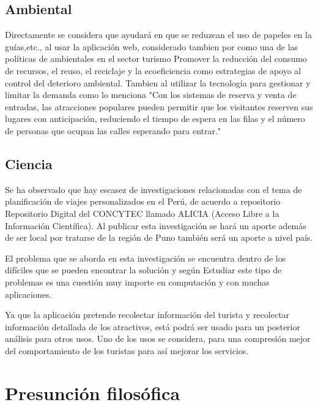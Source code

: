 \subsection{Ambiental}
Directamente se considera que ayudará en que se reduzcan el uso de papeles en la guías,etc., al usar la aplicación web, considerado tambien por  como una de las políticas de ambientales en el sector turismo Promover la reducción del consumo de recursos, el reuso, el reciclaje y la ecoeficiencia como estrategias de apoyo al control del deterioro ambiental.  Tambien al utilizar la tecnología para gestionar y limitar la demanda como lo menciona  "Con los sistemas de reserva y venta de entradas, las atracciones populares pueden permitir que los visitantes reserven sus lugares con anticipación, reduciendo el tiempo de espera en las filas y el número de personas que ocupan las calles esperando para entrar."
\subsection{Ciencia}
Se ha observado que hay escasez de investigaciones relacionadas con el tema de planificación de viajes personalizados en el Perú, de acuerdo a repositorio Repositorio Digital del CONCYTEC llamado ALICIA (Acceso Libre a la Información Científica). Al publicar esta investigación se hará un aporte además de ser local por tratarse de la región de Puno también será un aporte a nivel país.

El problema que se aborda en esta investigación se encuentra dentro de los difíciles que se pueden encontrar la solución y según  Estudiar este tipo de problemas es una cuestión muy importe en computación y con muchas aplicaciones.

Ya que la aplicación pretende recolectar información del turista y recolectar información detallada de los atractivos, está podrá ser usado para un posterior análisis para otros usos. Uno de los usos se considera, para una compresión mejor del comportamiento de los turistas para así mejorar los servicios.
\section{Presunción filosófica}
